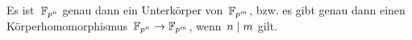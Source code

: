\begin{proposition}
  Es ist~$\mathbb{F}_{p^n}$ genau dann ein Unterkörper von~$\mathbb{F}_{p^m}$, bzw. es gibt genau dann einen Körperhomomorphismus~$\Finite_{p^n} \to \Finite_{p^m}$, wenn~$n \mid m$ gilt.
\end{proposition}





